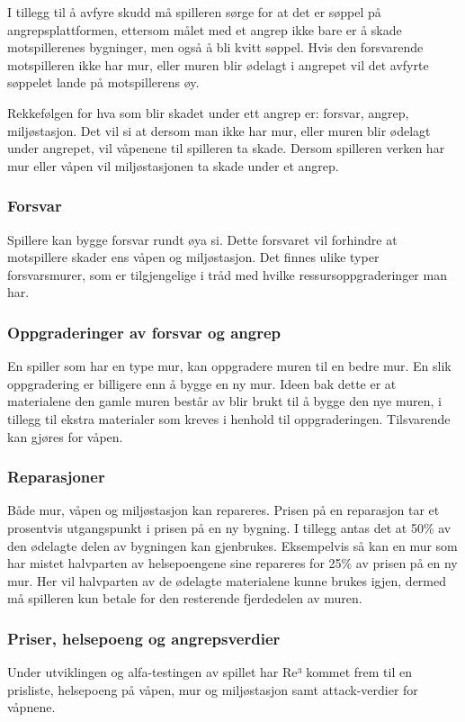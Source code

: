 I tillegg til å avfyre skudd må spilleren sørge for at det er søppel på angrepsplattformen, ettersom målet med et angrep ikke bare er å skade motspillerenes bygninger, men også å bli kvitt søppel. Hvis den forsvarende motspilleren ikke har mur, eller muren blir ødelagt i angrepet vil det avfyrte søppelet lande på motspillerens øy.

Rekkefølgen for hva som blir skadet under ett angrep er: forsvar, angrep, miljøstasjon. Det vil si at dersom man ikke har mur, eller muren blir ødelagt under angrepet, vil våpenene til spilleren ta skade. Dersom spilleren verken har mur eller våpen vil miljøstasjonen ta skade under et angrep. 


\subsubsection{Forsvar}
Spillere kan bygge forsvar rundt øya si. Dette forsvaret vil forhindre at motspillere skader ens våpen og miljøstasjon. Det finnes ulike typer forsvarsmurer, som er tilgjengelige i tråd med hvilke ressursoppgraderinger man har. 


\subsubsection{Oppgraderinger av forsvar og angrep}
En spiller som har en type mur, kan oppgradere muren til en bedre mur. En slik oppgradering er billigere enn å bygge en ny mur. Ideen bak dette er at materialene den gamle muren består av blir brukt til å bygge den nye muren, i tillegg til ekstra materialer som kreves i henhold til oppgraderingen. Tilsvarende kan gjøres for våpen.


\subsubsection{Reparasjoner}
Både mur, våpen og miljøstasjon kan repareres. Prisen på en reparasjon tar et prosentvis utgangspunkt i prisen på en ny bygning. I tillegg antas det at 50\% av den ødelagte delen av bygningen kan gjenbrukes. Eksempelvis så kan en mur som har mistet halvparten av helsepoengene sine repareres for 25\% av prisen på en ny mur. Her vil halvparten av de ødelagte materialene kunne brukes igjen, dermed må spilleren kun betale for den resterende fjerdedelen av muren.


\subsubsection{Priser, helsepoeng og angrepsverdier}
Under utviklingen og alfa-testingen av spillet har Re³ kommet frem til en prisliste, helsepoeng på våpen, mur og miljøstasjon samt attack-verdier for våpnene.

